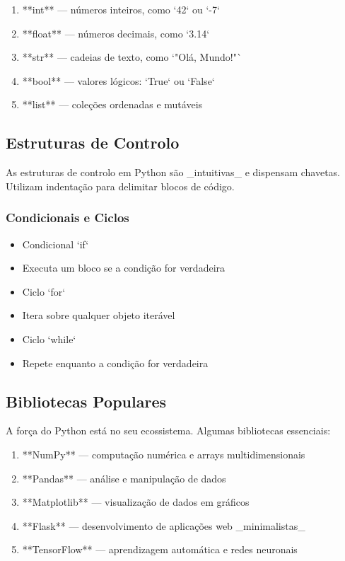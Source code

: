\documentclass{article}
\begin{document}
\begin{enumerate}
  \item **int** — números inteiros, como `42` ou `-7`

  \item **float** — números decimais, como `3.14`

  \item **str** — cadeias de texto, como `"Olá, Mundo!"`

  \item **bool** — valores lógicos: `True` ou `False`

  \item **list** — coleções ordenadas e mutáveis

\end{enumerate}
\subsection{Estruturas de Controlo}
As estruturas de controlo em Python são _intuitivas_ e dispensam chavetas.
Utilizam indentação para delimitar blocos de código.


\subsubsection{Condicionais e Ciclos}
\begin{itemize}
  \item Condicional `if`

  \item Executa um bloco se a condição for verdadeira

  \item Ciclo `for`

  \item Itera sobre qualquer objeto iterável

  \item Ciclo `while`

  \item Repete enquanto a condição for verdadeira

\end{itemize}
\subsection{Bibliotecas Populares}
A força do Python está no seu ecossistema. Algumas bibliotecas essenciais:


\begin{enumerate}
  \item **NumPy** — computação numérica e arrays multidimensionais

  \item **Pandas** — análise e manipulação de dados

  \item **Matplotlib** — visualização de dados em gráficos

  \item **Flask** — desenvolvimento de aplicações web _minimalistas_

  \item **TensorFlow** — aprendizagem automática e redes neuronais

\end{enumerate}
\end{document}

